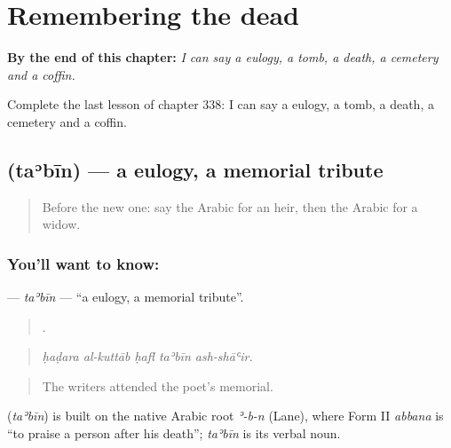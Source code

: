 
\chapter{Remembering the dead}
\label{ch:ar-remembering-the-dead}

\begin{chapteropening}
\textbf{By the end of this chapter:} \emph{I can say a eulogy, a tomb, a death, a cemetery and a coffin.}

Complete the last lesson of chapter 338: I can say a eulogy, a tomb, a death, a cemetery and a coffin.
\end{chapteropening}

\section[\texorpdfstring{\ar{تأبين} (taʾbīn)}{تأبين (taʾbīn)}]{ (taʾbīn) — a eulogy, a memorial tribute}

\label{lesson:AR-C338-tabin}



\begin{quote}
Before the new one: say the Arabic for an heir, then the Arabic for a widow.
\end{quote}

\subsection*{You'll want to know: }
\textbf{} — \emph{taʾbīn} — \textquotedblleft{}a eulogy, a memorial tribute\textquotedblright{}.

\begin{quote}
    .
\end{quote}

\begin{quote}
\emph{ḥaḍara al-kuttāb ḥafl taʾbīn ash-shāʿir.}
\end{quote}

\begin{quote}
The writers attended the poet’s memorial.
\end{quote}

\begin{cousinweb}
\textbf{} (\emph{taʾbīn}) is built on the native Arabic root \emph{ʾ-b-n} (Lane), where Form II \emph{abbana} is \textquotedblleft{}to praise a person after his death\textquotedblright{}; \emph{taʾbīn} is its verbal noun.
\end{cousinweb}

